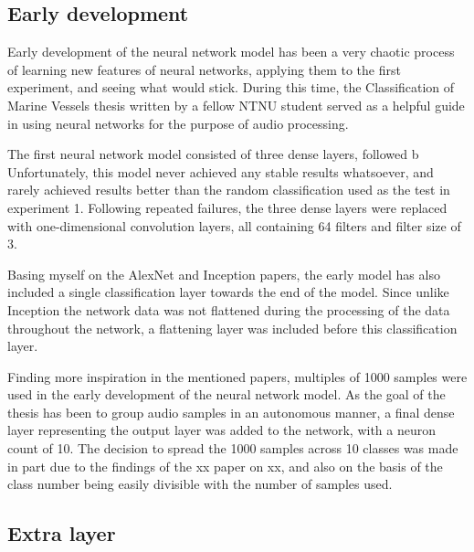 \subsection{Early development}
Early development of the neural network model has been a very chaotic process of learning new features of neural networks, applying them to the first experiment, and seeing what would stick.
During this time, the Classification of Marine Vessels thesis written by a fellow NTNU student served as a helpful guide in using neural networks for the purpose of audio processing.%

The first neural network model consisted of three dense layers, followed b
Unfortunately, this model never achieved any stable results whatsoever, and rarely achieved results better than the random classification used as the test in experiment 1.
Following repeated failures, the three dense layers were replaced with one-dimensional convolution layers, all containing 64 filters and filter size of 3.

Basing myself on the AlexNet and Inception papers, the early model has also included a single classification layer towards the end of the model.
Since unlike Inception the network data was not flattened during the processing of the data throughout the network, a flattening layer was included before this classification layer.

Finding more inspiration in the mentioned papers, multiples of 1000 samples were used in the early development of the neural network model.
As the goal of the thesis has been to group audio samples in an autonomous manner, a final dense layer representing the output layer was added to the network, with a neuron count of 10.
The decision to spread the 1000 samples across 10 classes was made in part due to the findings of the xx paper on xx, and also on the basis of the class number being easily divisible with the number of samples used.



\subsection{Extra layer} %

